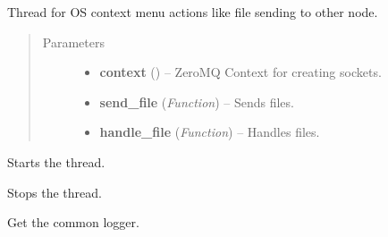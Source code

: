 \documentclass[letterpaper,10pt,english]{sphinxmanual}
\begin{document}
\begin{fulllineitems}
\label{threads:threads.contextmenu.SEND_FILE_CONTEX_MENU_HANDLER}
Thread for OS context menu actions like file sending to other node.
\begin{quote}\begin{description}
\item[{Parameters}] \leavevmode\begin{itemize}
\item {} 
\textbf{context} () -- ZeroMQ Context for creating sockets.

\item {} 
\textbf{send\_file} (\emph{Function}) -- Sends files.

\item {} 
\textbf{handle\_file} (\emph{Function}) -- Handles files.

\end{itemize}

\end{description}\end{quote}

\begin{fulllineitems}
\label{threads:threads.contextmenu.SEND_FILE_CONTEX_MENU_HANDLER.run}
Starts the thread.

\end{fulllineitems}


\begin{fulllineitems}
\label{threads:threads.contextmenu.SEND_FILE_CONTEX_MENU_HANDLER.stop}
Stops the thread.

\end{fulllineitems}


\end{fulllineitems}


\begin{fulllineitems}
\label{threads:threads.contextmenu.logger}
Get the common logger.

\end{fulllineitems}
\end{document}
